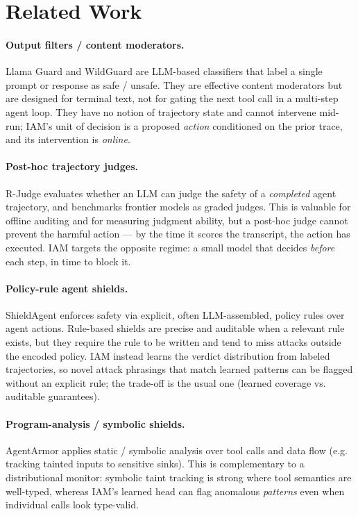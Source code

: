 \section{Related Work}
\label{sec:related}

\paragraph{Output filters / content moderators.}
Llama Guard \citep{llamaguard} and WildGuard \citep{wildguard} are LLM-based
classifiers that label a single prompt or response as safe / unsafe. They are
effective content moderators but are designed for terminal text, not for gating
the next tool call in a multi-step agent loop. They have no notion of
trajectory state and cannot intervene mid-run; IAM's unit of decision is
a proposed \emph{action} conditioned on the prior trace, and its intervention
is \emph{online}.

\paragraph{Post-hoc trajectory judges.}
R-Judge \citep{rjudge} evaluates whether an LLM can judge the safety of a
\emph{completed} agent trajectory, and benchmarks frontier models as graded
judges. This is valuable for offline auditing and for measuring judgment
ability, but a post-hoc judge cannot prevent the harmful action --- by the time
it scores the transcript, the action has executed. IAM targets the
opposite regime: a small model that decides \emph{before} each step, in time to
block it.

\paragraph{Policy-rule agent shields.}
ShieldAgent \citep{shieldagent} enforces safety via explicit, often
LLM-assembled, policy rules over agent actions. Rule-based shields are precise
and auditable when a relevant rule exists, but they require the rule to be
written and tend to miss attacks outside the encoded policy. IAM instead
learns the verdict distribution from labeled trajectories, so novel attack
phrasings that match learned patterns can be flagged without an explicit rule;
the trade-off is the usual one (learned coverage vs. auditable guarantees).

\paragraph{Program-analysis / symbolic shields.}
AgentArmor \citep{agentarmor} applies static / symbolic analysis over tool
calls and data flow (e.g. tracking tainted inputs to sensitive sinks). This is
complementary to a distributional monitor: symbolic taint tracking is strong
where tool semantics are well-typed, whereas IAM's learned head can flag
anomalous \emph{patterns} even when individual calls look type-valid.

